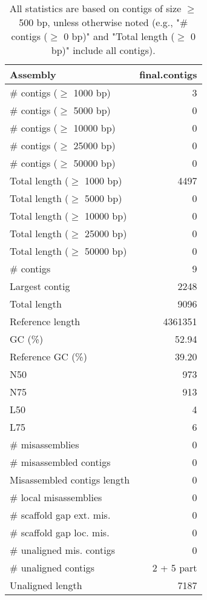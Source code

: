 \documentclass[12pt,a4paper]{article}
\begin{document}
\begin{table}[ht]
\begin{center}
\caption{All statistics are based on contigs of size $\geq$ 500 bp, unless otherwise noted (e.g., "\# contigs ($\geq$ 0 bp)" and "Total length ($\geq$ 0 bp)" include all contigs).}
\begin{tabular}{|l*{1}{|r}|}
\hline
Assembly & final.contigs \\ \hline
\# contigs ($\geq$ 1000 bp) & 3 \\ \hline
\# contigs ($\geq$ 5000 bp) & 0 \\ \hline
\# contigs ($\geq$ 10000 bp) & 0 \\ \hline
\# contigs ($\geq$ 25000 bp) & 0 \\ \hline
\# contigs ($\geq$ 50000 bp) & 0 \\ \hline
Total length ($\geq$ 1000 bp) & 4497 \\ \hline
Total length ($\geq$ 5000 bp) & 0 \\ \hline
Total length ($\geq$ 10000 bp) & 0 \\ \hline
Total length ($\geq$ 25000 bp) & 0 \\ \hline
Total length ($\geq$ 50000 bp) & 0 \\ \hline
\# contigs & 9 \\ \hline
Largest contig & 2248 \\ \hline
Total length & 9096 \\ \hline
Reference length & 4361351 \\ \hline
GC (\%) & 52.94 \\ \hline
Reference GC (\%) & 39.20 \\ \hline
N50 & 973 \\ \hline
N75 & 913 \\ \hline
L50 & 4 \\ \hline
L75 & 6 \\ \hline
\# misassemblies & 0 \\ \hline
\# misassembled contigs & 0 \\ \hline
Misassembled contigs length & 0 \\ \hline
\# local misassemblies & 0 \\ \hline
\# scaffold gap ext. mis. & 0 \\ \hline
\# scaffold gap loc. mis. & 0 \\ \hline
\# unaligned mis. contigs & 0 \\ \hline
\# unaligned contigs & 2 + 5 part \\ \hline
Unaligned length & 7187 \\ \hline

\end{tabular}
\end{center}
\end{table}
\end{document}

